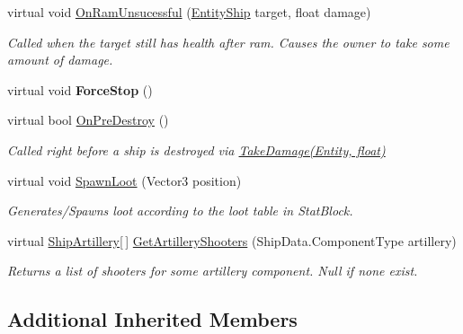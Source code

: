 \begin{DoxyCompactItemize}
\item 
virtual void \hyperlink{class_skyrates_1_1_entity_1_1_entity_ship_a0fb7fa6590e1bd661daeff6de8210eda}{On\-Ram\-Unsucessful} (\hyperlink{class_skyrates_1_1_entity_1_1_entity_ship}{Entity\-Ship} target, float damage)
\begin{DoxyCompactList}\small\item\em Called when the target still has health after ram. Causes the owner to take some amount of damage. \end{DoxyCompactList}\item 
\hypertarget{class_skyrates_1_1_entity_1_1_entity_ship_ad6563d11928b585846bb5725636c1c95}{virtual void {\bfseries Force\-Stop} ()}\label{class_skyrates_1_1_entity_1_1_entity_ship_ad6563d11928b585846bb5725636c1c95}

\item 
virtual bool \hyperlink{class_skyrates_1_1_entity_1_1_entity_ship_aeb574a950c7e9d3cd9e18feed7999345}{On\-Pre\-Destroy} ()
\begin{DoxyCompactList}\small\item\em Called right before a ship is destroyed via \hyperlink{class_skyrates_1_1_entity_1_1_entity_ship_a3ad30bc27cf8344c4acbfea78f8ee373}{Take\-Damage(\-Entity, float)} \end{DoxyCompactList}\item 
virtual void \hyperlink{class_skyrates_1_1_entity_1_1_entity_ship_aa874ee45513a0f394244ac752b37b506}{Spawn\-Loot} (Vector3 position)
\begin{DoxyCompactList}\small\item\em Generates/\-Spawns loot according to the loot table in Stat\-Block. \end{DoxyCompactList}\item 
virtual \hyperlink{class_skyrates_1_1_ship_1_1_ship_artillery}{Ship\-Artillery}\mbox{[}$\,$\mbox{]} \hyperlink{class_skyrates_1_1_entity_1_1_entity_ship_a75c4b113dd48dba91c0abaaa1372ed1a}{Get\-Artillery\-Shooters} (Ship\-Data.\-Component\-Type artillery)
\begin{DoxyCompactList}\small\item\em Returns a list of shooters for some artillery component. Null if none exist. \end{DoxyCompactList}\end{DoxyCompactItemize}
\subsection*{Additional Inherited Members}


